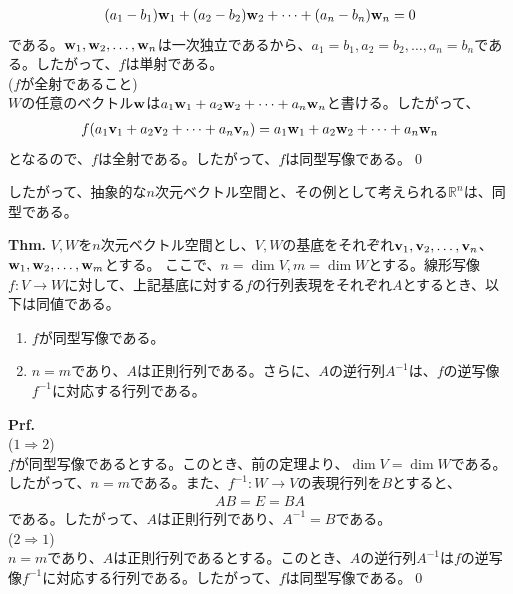 \documentclass[a4paper,11pt]{jsarticle}
\numberwithin{equation}{section}
\begin{document}
\begin{align}
  (a_1 - b_1)\vb{w}_1 + (a_2 - b_2)\vb{w}_2 + \dots + (a_n - b_n)\vb{w}_n = 0
\end{align}
である。$\vb{w}_1, \vb{w}_2, \dots, \vb{w}_n$は一次独立であるから、$a_1 = b_1, a_2 = b_2, \dots, a_n = b_n$である。したがって、$f$は単射である。\\
($f$が全射であること)\\
$W$の任意のベクトル$\vb{w}$は$a_1\vb{w}_1 + a_2\vb{w}_2 + \dots + a_n\vb{w}_n$と書ける。したがって、
\begin{align}
  f(a_1\vb{v}_1 + a_2\vb{v}_2 + \dots + a_n\vb{v}_n) = a_1\vb{w}_1 + a_2\vb{w}_2 + \dots + a_n\vb{w}_n
\end{align}
となるので、$f$は全射である。したがって、$f$は同型写像である。\qed

したがって、抽象的な$n$次元ベクトル空間と、その例として考えられる$\mathbb{R}^n$は、同型である。\\

\begin{itembox}[l]{\textbf{Thm.}}
  $V, W$を$n$次元ベクトル空間とし、$V, W$の基底をそれぞれ$\vb{v}_1, \vb{v}_2, \dots, \vb{v}_n$、$\vb{w}_1, \vb{w}_2, \dots, \vb{w}_m$とする。
  ここで、$n = \dim V, m = \dim W$とする。線形写像$f:V \to W$に対して、上記基底に対する$f$の行列表現をそれぞれ$A$とするとき、以下は同値である。
  \begin{enumerate}
    \item $f$が同型写像である。
    \item $n=m$であり、$A$は正則行列である。さらに、$A$の逆行列$A^{-1}$は、$f$の逆写像$f^{-1}$に対応する行列である。
  \end{enumerate}
\end{itembox}
\textbf{Prf.}\\
($1 \Rightarrow 2$)\\
$f$が同型写像であるとする。このとき、前の定理より、$\dim V = \dim W$である。したがって、$n = m$である。また、$f^{-1}:W \to V$の表現行列を$B$とすると、
\begin{align}
  AB = E = BA
\end{align}
である。したがって、$A$は正則行列であり、$A^{-1} = B$である。\\
($2 \Rightarrow 1$)\\
$n=m$であり、$A$は正則行列であるとする。このとき、$A$の逆行列$A^{-1}$は$f$の逆写像$f^{-1}$に対応する行列である。したがって、$f$は同型写像である。\qed
\end{document}
